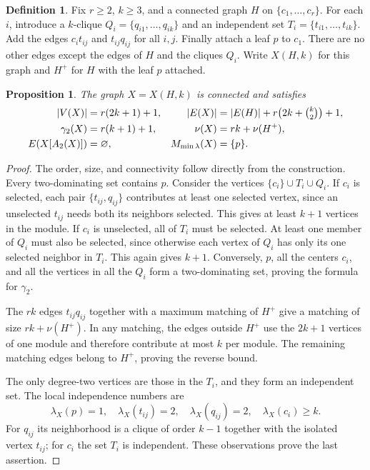 \documentclass[11pt,a4paper]{article}
\newtheorem{proposition}[theorem]{Proposition}
\theoremstyle{definition}\newtheorem{definition}[theorem]{Definition}
\theoremstyle{remark}\newtheorem{remark}[theorem]{Remark}
\begin{document}
\begin{definition}
\label{early:def:394-family}
Fix $r\geq2$, $k\geq3$, and a connected graph $H$ on
$\{c_1,\ldots,c_r\}$.  For each $i$, introduce a $k$-clique
$Q_i=\{q_{i1},\ldots,q_{ik}\}$ and an independent set
$T_i=\{t_{i1},\ldots,t_{ik}\}$.  Add the edges
$c_it_{ij}$ and $t_{ij}q_{ij}$ for all $i,j$.  Finally attach a leaf $p$
to $c_1$.  There are no other edges except the edges of $H$ and the
cliques $Q_i$.  Write $X(H,k)$ for this graph and $H^+$ for $H$ with
the leaf $p$ attached.
\end{definition}

\begin{proposition}
\label{early:prop:394-invariants}
The graph $X=X(H,k)$ is connected and satisfies
\begin{align*}
 |V(X)|&=r(2k+1)+1,&
 |E(X)|&=|E(H)|+r\bigl(2k+\tbinom{k}{2}\bigr)+1,\\
 \gamma_2(X)&=r(k+1)+1,&
 \nu(X)&=rk+\nu(H^+),\\
 E(X[A_2(X)])&=\varnothing,&
 M_{\min\lambda}(X)&=\{p\}.
\end{align*}
\end{proposition}
\begin{proof}
The order, size, and connectivity follow directly from the construction.
Every two-dominating set contains $p$.  Consider the vertices
$\{c_i\}\cup T_i\cup Q_i$.  If $c_i$ is selected, each pair
$\{t_{ij},q_{ij}\}$ contributes at least one selected vertex, since an
unselected $t_{ij}$ needs both its neighbors selected.  This gives at
least $k+1$ vertices in the module.  If $c_i$ is unselected, all of
$T_i$ must be selected.  At least one member of $Q_i$ must also be
selected, since otherwise each vertex of $Q_i$ has only its one selected
neighbor in $T_i$.  This again gives $k+1$.  Conversely, $p$, all the
centers $c_i$, and all the vertices in all the $Q_i$ form a
two-dominating set, proving the formula for $\gamma_2$.

The $rk$ edges $t_{ij}q_{ij}$ together with a maximum matching of $H^+$
give a matching of size $rk+\nu(H^+)$.  In any matching, the edges
outside $H^+$ use the $2k+1$ vertices of one module and therefore
contribute at most $k$ per module.  The remaining matching edges belong
to $H^+$, proving the reverse bound.

The only degree-two vertices are those in the $T_i$, and they form an
independent set.  The local independence numbers are
\[
 \lambda_X(p)=1,\quad \lambda_X(t_{ij})=2,\quad
 \lambda_X(q_{ij})=2,\quad \lambda_X(c_i)\geq k.
\]
For $q_{ij}$ its neighborhood is a clique of order $k-1$ together with
the isolated vertex $t_{ij}$; for $c_i$ the set $T_i$ is independent.
These observations prove the last assertion.
\end{proof}
\end{document}
